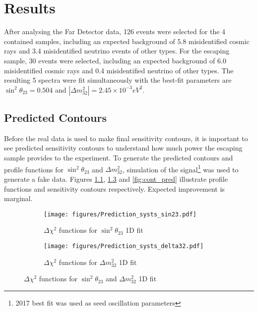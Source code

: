 \chapter{Results}
\label{results_chapter}

After analysing the Far Detector data, 126 events were selected for the 4 contained 
samples, including an expected background of 5.8 misidentified cosmic rays and 3.4 misidentified 
neutrino events of other types. For the escaping sample, 30 events were selected, including an expected
background of 6.0 misidentified cosmic rays and 0.4 misidentified neutrino of other types. The resulting
5 spectra were fit simultaneously with the best-fit parameters are $\sin^2\theta_{23} = 0.504$ and 
$|\Delta m^2_{32}| = 2.45\times 10^{-3} eV^2$.

\section{Predicted Contours}
Before the real data is used to make final sensitivity contours, it is important to see predicted 
sensitivity contours to understand how much power the escaping sample provides to the experiment. 
To generate the predicted contours and profile functions for $\sin^2\theta_{23}$ and $\Delta m^2_{32}$, simulation
of the signal\footnote{2017 best fit was used as seed oscillation parameters} was used to generate a fake data.
Figures \ref{fig:profile_pred_sin}, \ref{fig:profile_pred_delta} and \ref{fig:cont_pred} illustrate profile 
functions and sensitivity contours respectively. Expected improvement is marginal.

\begin{figure}[!th]
\centering
\begin{subfigure}[t]{0.95\textwidth}
  \centering
  \texttt{[image: figures/Prediction\_systs\_sin23.pdf]}
  \caption{ $\Delta\chi^2$ functions for $\sin^2\theta_{23}$ 1D fit}
  \label{fig:profile_pred_sin}
\end{subfigure}
\vspace{0.5cm}
\newline
\begin{subfigure}[t]{0.95\textwidth}
  \centering
  \texttt{[image: figures/Prediction\_systs\_delta32.pdf]}
  \caption{$\Delta\chi^2$ functions for $\Delta m^2_{32}$ 1D fit}
  \label{fig:profile_pred_delta}
\end{subfigure}
\caption{ $\Delta\chi^2$ functions for $\sin^2\theta_{23}$ and $\Delta m^2_{32}$ 1D fit }
{}
\end{figure}


